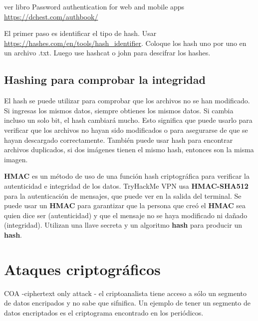 \color{red} ver libro  Password authentication for web and mobile apps \url{https://dchest.com/authbook/}
\color{black}




El primer paso es identificar el tipo de hash.
Usar \url{https://hashes.com/en/tools/hash_identifier}. Coloque los hash uno por uno en un archivo .txt. Luego use hashcat o john para descifrar los hashes.



\subsection{Hashing para comprobar la integridad}

El hash se puede utilizar para comprobar que los archivos no se han modificado. Si ingresas los mismos datos, siempre obtienes los mismos datos. Si cambia incluso un solo bit, el hash cambiará mucho. Esto significa que puede usarlo para verificar que los archivos no hayan sido modificados o para asegurarse de que se hayan descargado correctamente. También puede usar hash para encontrar archivos duplicados, si dos imágenes tienen el mismo hash, entonces son la misma imagen.


\begin{tcolorbox}
[colback=gray!5!white,colframe=orange!60!gray,title= HMAC]
\textbf{HMAC} es un método de uso de una función hash criptográfica para verificar la autenticidad e integridad de los datos. TryHackMe VPN usa \textbf{HMAC-SHA512} para la autenticación de mensajes, que puede ver en la salida del terminal. Se puede usar un \textbf{HMAC} para garantizar que la persona que creó el \textbf{HMAC} sea quien dice ser (autenticidad) y que el mensaje no se haya modificado ni dañado (integridad). Utilizan una llave secreta y un algoritmo \textbf{hash} para producir un \textbf{hash}.
\end{tcolorbox}




\section{Ataques criptográficos}

COA -ciphertext only attack - el criptoanalista tiene acceso a sólo un segmento de datos encripados y no sabe que sifnifica. Un ejemplo de tener un segmento de datos encriptados es el criptograma encontrado en los periódicos. 

